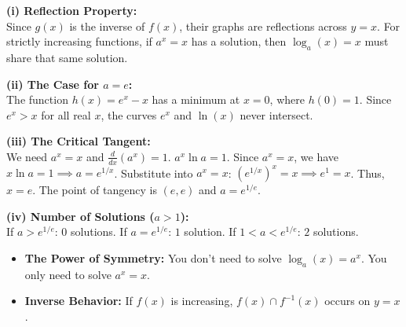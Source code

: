 \begin{solution}
\textbf{(i) Reflection Property:}\\
Since $g(x)$ is the inverse of $f(x)$, their graphs are reflections across $y=x$. For strictly increasing functions, if $a^x = x$ has a solution, then $\log_a(x) = x$ must share that same solution.

\textbf{(ii) The Case for $a=e$:}\\
The function $h(x) = e^x - x$ has a minimum at $x=0$, where $h(0) = 1$. Since $e^x > x$ for all real $x$, the curves $e^x$ and $\ln(x)$ never intersect.

\textbf{(iii) The Critical Tangent:}\\
We need $a^x = x$ and $\frac{d}{dx}(a^x) = 1$.
$a^x \ln a = 1$. Since $a^x = x$, we have $x \ln a = 1 \implies a = e^{1/x}$.
Substitute into $a^x = x$: $(e^{1/x})^x = x \implies e^1 = x$.
Thus, $x = e$. The point of tangency is $(e, e)$ and $a = e^{1/e}$.

\textbf{(iv) Number of Solutions ($a > 1$):}\\
If $a > e^{1/e}$: $0$ solutions.
If $a = e^{1/e}$: $1$ solution.
If $1 < a < e^{1/e}$: $2$ solutions.
\end{solution}

\begin{takeaways}
\begin{itemize}[leftmargin=*]
\item \textbf{The Power of Symmetry:} You don't need to solve $\log_a(x) = a^x$. You only need to solve $a^x = x$.
\item \textbf{Inverse Behavior:} If $f(x)$ is increasing, $f(x) \cap f^{-1}(x)$ occurs on $y=x$.
\end{itemize}
\end{takeaways}

